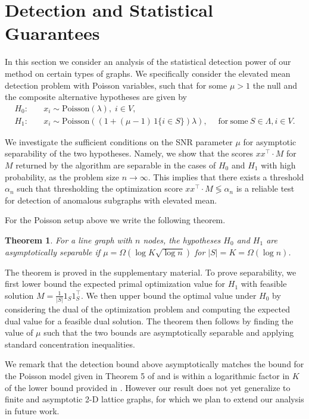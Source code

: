 \documentclass{article}
\newtheorem{theorem}{Theorem}[section]
\begin{document}
\section{Detection and Statistical Guarantees}

In this section we consider an analysis of the statistical detection power of our method on certain types of graphs. We specifically consider the elevated mean detection problem with Poisson variables, such that for some $\mu > 1$ the null and the composite alternative hypotheses are given by
\begin{align*}
  H_0 : & \quad x_i \sim \mathrm{Poisson}(\lambda), \; i \in V, \\
  H_1 : & \quad x_i \sim \mathrm{Poisson}((1 + (\mu-1)\, 1\{i \in S\})\lambda), \quad \; \mathrm{for~some}~S \in \Lambda, i \in V.
\end{align*}

We investigate the sufficient conditions on the SNR parameter $\mu$ for asymptotic separability of the two hypotheses. Namely, we show that the scores $x x^\top \cdot M$ for $M$ returned by the algorithm are separable in the cases of $H_0$ and $H_1$ with high probability, as the problem size $n \to \infty$. This implies that there exists a threshold $\alpha_n$ such that thresholding the optimization score $x x^\top \cdot M \lessgtr \alpha_n$ is a reliable test for detection of anomalous subgraphs with elevated mean.

For the Poisson setup above we write the following theorem.
\begin{theorem}\label{thm:line_bound}
  For a line graph with $n$ nodes, the hypotheses $H_0$ and $H_1$ are asymptotically separable if $\mu = \Omega( \log K \sqrt{\log n} )$ for $|S| = K = \Omega(\log n)$.
\end{theorem}
The theorem is proved in the supplementary material. To prove separability, we first lower bound the expected primal optimization value for $H_1$ with feasible solution $M = \frac{1}{|S|} 1_S 1_S^\top$. We then upper bound the optimal value under $H_0$ by considering the dual of the optimization problem and computing the expected dual value for a feasible dual solution. The theorem then follows by finding the value of $\mu$ such that the two bounds are asymptotically separable and applying standard concentration inequalities.

We remark that the detection bound above asymptotically matches the bound for the Poisson model given in Theorem 5 of \cite{nips14} and is within a logarithmic factor in $K$ of the lower bound provided in \cite{nips14}. However our result does not yet generalize to finite and asymptotic 2-D lattice graphs, for which we plan to extend our analysis in future work.
\end{document}
